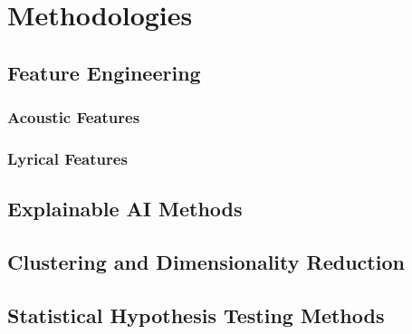\chapter{Methodologies}
\label{cha:methodologies}

\section{Feature Engineering}
\label{sec:featureengineering}



\subsection{Acoustic Features}
\label{sec:acousticfeatures}

\subsection{Lyrical Features}
\label{sec:lyricalfeatures}


\section{Explainable AI Methods}
\label{sec:explainableaimethods}


\section{Clustering and Dimensionality Reduction}
\label{sec:clusteringanddimensionalityreduction}


\section{Statistical Hypothesis Testing Methods}
\label{sec:statisticalhypothesistestingmethods}



